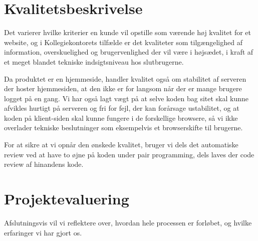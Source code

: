 \documentclass[12pt, a4paper]{report}
\begin{document}
\section{Kvalitetsbeskrivelse}
Det varierer hvilke kriterier en kunde vil opstille som værende høj kvalitet for et website, og i Kollegiekontorets tilfælde er det kvaliteter som tilgængelighed af information, overskuelighed og brugervenlighed der vil være i højsædet, i kraft af et meget blandet tekniske indsigtsniveau hos slutbrugerne.



Da produktet er en hjemmeside, handler kvalitet også om stabilitet af serveren der hoster hjemmesiden, at den ikke er for langsom når der er mange brugere logget på en gang. Vi har også lagt vægt på at selve koden bag sitet skal kunne afvikles hurtigt på serveren og fri for fejl, der kan forårsage ustabilitet, og at koden på klient-siden skal kunne fungere i de forskellige browsere, så vi ikke overlader tekniske beslutninger som eksempelvis et browserskifte til brugerne.

For at sikre at vi opnår den ønskede kvalitet, bruger vi dels det automatiske review ved at have to øjne på koden under pair programming, dels laves der code review af hinandens kode.

\section{Projektevaluering}
Afslutningsvis vil vi reflektere over, hvordan hele processen er forløbet, og hvilke erfaringer vi har gjort os.
\end{document}
